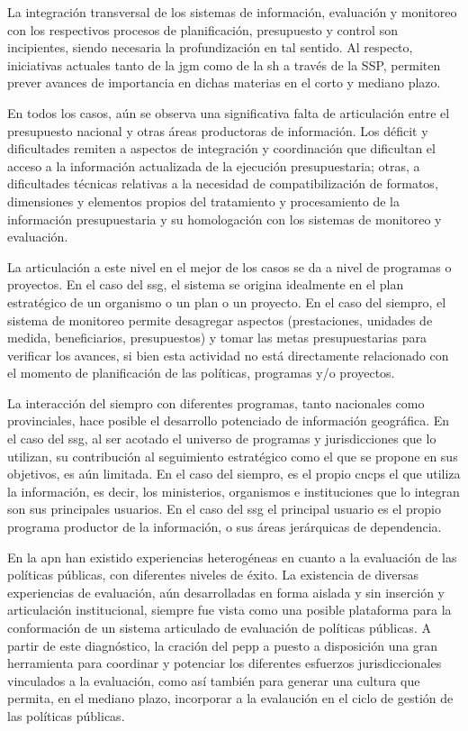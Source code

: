 La integración transversal de los sistemas de información, evaluación y monitoreo con los respectivos procesos de planificación, presupuesto y control son incipientes, siendo necesaria la profundización en tal sentido. Al respecto, iniciativas actuales tanto de la \ac{jgm} como de la \ac{sh} a través de la SSP, permiten prever avances de importancia en dichas materias en el corto y mediano plazo.

En todos los casos, aún se observa una significativa falta de articulación entre el presupuesto nacional y otras áreas productoras de información. Los déficit y dificultades remiten a aspectos de integración y coordinación que dificultan el acceso a la información actualizada de la ejecución presupuestaria; otras, a dificultades técnicas relativas a la necesidad de compatibilización de formatos, dimensiones y elementos propios del tratamiento y procesamiento de la información presupuestaria y su homologación con los sistemas de monitoreo y evaluación. 

La articulación a este nivel en el mejor de los casos se da a nivel de programas o proyectos. En el caso del \ac{ssg}, el sistema se origina idealmente en el plan estratégico de un organismo o un plan o un proyecto. En el caso del \ac{siempro}, el sistema de monitoreo permite desagregar aspectos (prestaciones, unidades de medida, beneficiarios, presupuestos) y tomar las metas presupuestarias para verificar los avances, si bien esta actividad no está directamente relacionado con el momento de planificación de las políticas, programas y/o proyectos.

La interacción del \ac{siempro} con diferentes programas, tanto nacionales como provinciales, hace posible el desarrollo potenciado de información geográfica. En el caso del \ac{ssg}, al ser acotado el universo de programas y jurisdicciones que lo utilizan, su contribución al seguimiento estratégico como el que se propone en sus objetivos, es aún limitada. En el caso del \ac{siempro}, es el propio \ac{cncps} el que utiliza la información, es decir, los ministerios, organismos e instituciones que lo integran son sus principales usuarios. En el caso del \ac{ssg} el principal usuario es el propio programa productor de la información, o sus áreas jerárquicas de dependencia.

En la \ac{apn} han existido experiencias heterogéneas en cuanto a la evaluación de las políticas públicas, con diferentes niveles de éxito. La existencia de diversas experiencias de evaluación, aún desarrolladas en forma aislada y sin inserción y articulación institucional, siempre fue vista como una posible plataforma para la conformación de un sistema articulado de evaluación de políticas públicas. A partir de este diagnóstico, la cración del \ac{pepp} a puesto a disposición una gran herramienta para coordinar y potenciar los diferentes esfuerzos jurisdiccionales vinculados a la evaluación, como así también para generar una cultura que permita, en el mediano plazo, incorporar a la evalaución en el ciclo de gestión de las políticas públicas. 